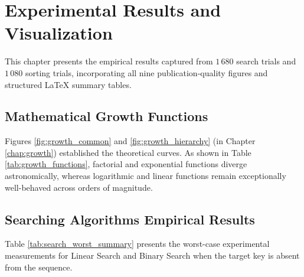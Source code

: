 \documentclass[11pt,a4paper,oneside]{report}
\theoremstyle{definition}
\begin{document}
\chapter{Experimental Results and Visualization}
\label{chap:results}

This chapter presents the empirical results captured from $1\,680$ search trials and $1\,080$ sorting trials, incorporating all nine publication-quality figures and structured LaTeX summary tables.

\section{Mathematical Growth Functions}
Figures \ref{fig:growth_common} and \ref{fig:growth_hierarchy} (in Chapter \ref{chap:growth}) established the theoretical curves. As shown in Table \ref{tab:growth_functions}, factorial and exponential functions diverge astronomically, whereas logarithmic and linear functions remain exceptionally well-behaved across orders of magnitude.

\section{Searching Algorithms Empirical Results}
Table \ref{tab:search_worst_summary} presents the worst-case experimental measurements for Linear Search and Binary Search when the target key is absent from the sequence.
\end{document}
